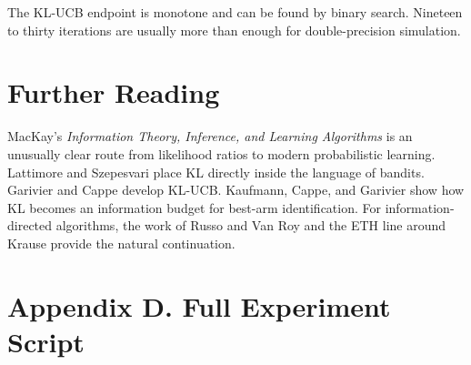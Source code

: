 \documentclass[en,nofont,11pt]{elegantbook}
\begin{document}
The KL-UCB endpoint is monotone and can be found by binary search. Nineteen to thirty iterations are usually more than enough for double-precision simulation.

\chapter*{Further Reading}

MacKay's \emph{Information Theory, Inference, and Learning Algorithms} is an unusually clear route from likelihood ratios to modern probabilistic learning. Lattimore and Szepesvari place KL directly inside the language of bandits. Garivier and Cappe develop KL-UCB. Kaufmann, Cappe, and Garivier show how KL becomes an information budget for best-arm identification. For information-directed algorithms, the work of Russo and Van Roy and the ETH line around Krause provide the natural continuation.


\chapter*{Appendix D. Full Experiment Script}



\nocite{kullback1951information,mackay2003information,cover2006elements,lattimore2020bandit,lai1985,garivier2011klucb,kaufmann2016complexity,russo2016information,srinivas2010gpucb,kirschner2018information,ru2018fast,ghahramani2015probabilistic,jin2022expts,yang2024minimal}
\printbibliography
\end{document}
